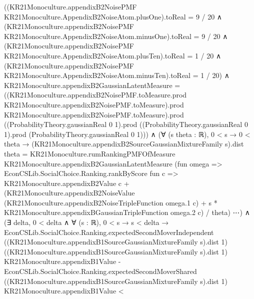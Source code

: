 \documentclass[10pt]{article}
\begin{document}
\begin{ReviewVerbatim}
              ((KR21Monoculture.appendixB2NoisePMF KR21Monoculture.AppendixB2NoiseAtom.plusOne).toReal = 9 / 20 ∧
                  (KR21Monoculture.appendixB2NoisePMF KR21Monoculture.AppendixB2NoiseAtom.minusOne).toReal = 9 / 20 ∧
                    (KR21Monoculture.appendixB2NoisePMF KR21Monoculture.AppendixB2NoiseAtom.plusTen).toReal = 1 / 20 ∧
                      (KR21Monoculture.appendixB2NoisePMF KR21Monoculture.AppendixB2NoiseAtom.minusTen).toReal =
                        1 / 20) ∧
                KR21Monoculture.appendixB2GaussianLatentMeasure =
                    ((KR21Monoculture.appendixB2NoisePMF.toMeasure.prod
                              KR21Monoculture.appendixB2NoisePMF.toMeasure).prod
                          KR21Monoculture.appendixB2NoisePMF.toMeasure).prod
                      ((ProbabilityTheory.gaussianReal 0 1).prod
                        ((ProbabilityTheory.gaussianReal 0 1).prod (ProbabilityTheory.gaussianReal 0 1))) ∧
                  (∀ (s theta : ℝ),
                      0 < s →
                        0 < theta →
                          (KR21Monoculture.appendixB2SourceGaussianMixtureFamily s).dist theta =
                            KR21Monoculture.rumRankingPMFOfMeasure KR21Monoculture.appendixB2GaussianLatentMeasure
                              (fun omega =>
                                EconCSLib.SocialChoice.Ranking.rankByScore fun c =>
                                  KR21Monoculture.appendixB2Value c +
                                    (KR21Monoculture.appendixB2NoiseValue
                                          (KR21Monoculture.appendixB2NoiseTripleFunction omega.1 c) +
                                        s * KR21Monoculture.appendixBGaussianTripleFunction omega.2 c) /
                                      theta)
                              ⋯) ∧
                    (∃ delta,
                        0 < delta ∧
                          ∀ (s : ℝ),
                            0 < s →
                              s < delta →
                                EconCSLib.SocialChoice.Ranking.expectedSecondMoverIndependent
                                      ((KR21Monoculture.appendixB1SourceGaussianMixtureFamily s).dist 1)
                                      ((KR21Monoculture.appendixB1SourceGaussianMixtureFamily s).dist 1)
                                      KR21Monoculture.appendixB1Value -
                                    EconCSLib.SocialChoice.Ranking.expectedSecondMoverShared
                                      ((KR21Monoculture.appendixB1SourceGaussianMixtureFamily s).dist 1)
                                      KR21Monoculture.appendixB1Value <

\end{ReviewVerbatim}
\end{document}
